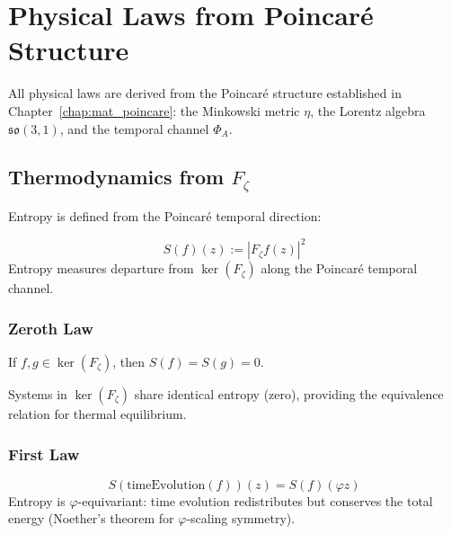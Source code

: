 \chapter{Physical Laws from Poincar\'{e} Structure}
\label{chap:mat_physical_laws}

All physical laws are derived from the Poincar\'{e} structure established in Chapter~\ref{chap:mat_poincare}: the Minkowski metric $\eta$, the Lorentz algebra $\mathfrak{so}(3,1)$, and the temporal channel $\Phi_A$.

\section{Thermodynamics from \texorpdfstring{$F_\zeta$}{Fζ}}
\label{sec:mat_thermodynamics}

Entropy is defined from the Poincar\'{e} temporal direction:

\begin{definition}[Entropy]
\label{def:mat_entropy}
\leanok
\[
S(f)(z) := |F_\zeta f(z)|^2
\]
Entropy measures departure from $\ker(F_\zeta)$ along the Poincar\'{e} temporal channel.
\end{definition}

\subsection{Zeroth Law}

\begin{theorem}
\label{thm:mat_zeroth_law}
\leanok
If $f, g \in \ker(F_\zeta)$, then $S(f) = S(g) = 0$.
\end{theorem}

Systems in $\ker(F_\zeta)$ share identical entropy (zero), providing the equivalence relation for thermal equilibrium.

\subsection{First Law}

\begin{theorem}
\label{thm:mat_first_law}
\leanok
\[
S(\mathrm{timeEvolution}(f))(z) = S(f)(\varphi z)
\]
Entropy is $\varphi$-equivariant: time evolution redistributes but conserves the total energy (Noether's theorem for $\varphi$-scaling symmetry).
\end{theorem}

